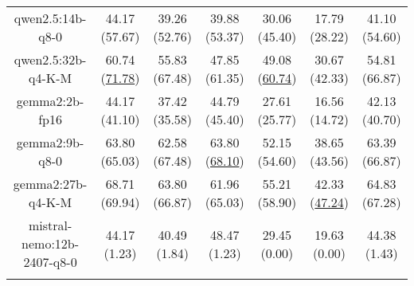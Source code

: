 \begin{table}[hbp]
{\begin{tabular}{ccccccc}
      \multicolumn{1}{c|}{qwen2.5:14b-q8-0} & 44.17 (57.67) & 39.26 (52.76) & \multicolumn{1}{c|}{39.88 (53.37)} & 30.06 (45.40) & \multicolumn{1}{c|}{17.79 (28.22)} & 41.10 (54.60) \\

      \multicolumn{1}{c|}{qwen2.5:32b-q4-K-M} & 60.74 (\underline{71.78}) & 55.83 (67.48) & \multicolumn{1}{c|}{47.85 (61.35)} & 49.08 (\underline{60.74}) & \multicolumn{1}{c|}{30.67 (42.33)} & 54.81 (66.87) \\

      \multicolumn{1}{c|}{gemma2:2b-fp16} & 44.17 (41.10) & 37.42 (35.58) & \multicolumn{1}{c|}{44.79 (45.40)} & 27.61 (25.77) & \multicolumn{1}{c|}{16.56 (14.72)} & 42.13 (40.70) \\

      \multicolumn{1}{c|}{gemma2:9b-q8-0} & 63.80 (65.03) & 62.58 (67.48) & \multicolumn{1}{c|}{63.80 (\underline{68.10})} & 52.15 (54.60) & \multicolumn{1}{c|}{38.65 (43.56)} & 63.39 (66.87) \\

      \multicolumn{1}{c|}{gemma2:27b-q4-K-M} & 68.71 (69.94) & 63.80 (66.87) & \multicolumn{1}{c|}{61.96 (65.03)} & 55.21 (58.90) & \multicolumn{1}{c|}{42.33 (\underline{47.24})} & 64.83 (67.28) \\

      \multicolumn{1}{c|}{mistral-nemo:12b-2407-q8-0} & 44.17 (1.23) & 40.49 (1.84) & \multicolumn{1}{c|}{48.47 (1.23)} & 29.45 (0.00) & \multicolumn{1}{c|}{19.63 (0.00)} & 44.38 (1.43) \\

      \\ \hline
    \end{tabular}%
  }
\end{table}